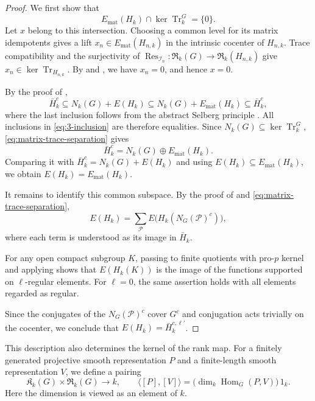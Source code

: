 \documentclass[11pt,letterpaper]{amsart}
\theoremstyle{definition}
\numberwithin{equation}{section}
\numberwithin{theorem}{section}
\newcommand{\kk}{k}
\newcommand{\CI}{\mathcal I}
\newcommand{\cR}{\mathfrak R}
\newcommand{\cK}{\mathfrak K}
\DeclareMathOperator{\Tr}{Tr}
\DeclareMathOperator{\Hom}{Hom}
\DeclareMathOperator{\Res}{Res}
\begin{document}
\begin{proof}We first show that
\begin{equation}\label{eq:matrix-trace-separation}
 E_{\mathrm{mat}}(H_\kk)\cap\ker\Tr_\kk^G=\{0\}.
\end{equation}
Let $x$ belong to this intersection. Choosing a common
level for its matrix idempotents gives a lift
$x_n\in E_{\mathrm{mat}}(H_{n,\kk})$ in the intrinsic
cocenter of $H_{n,\kk}$.
Trace compatibility and the surjectivity of
$\Res_{\CI_n}:\cR_\kk(G)\to\cR_\kk(H_{n,\kk})$
give $x_n\in\ker\Tr_{H_{n,\kk}}$.
By  and ,
we have $x_n=0$, and hence $x=0$.

By the proof of ,
\begin{equation}\label{eq:3-inclusion}
 \bar H_\kk^c
 \subseteq N_\kk(G)+E(H_\kk)
 \subseteq N_\kk(G)+E_{\mathrm{mat}}(H_\kk)
 \subseteq\bar H_\kk^c,
\end{equation}
where the last inclusion follows from the abstract
Selberg principle .
All inclusions in \eqref{eq:3-inclusion} are therefore equalities.
Since $N_\kk(G)\subseteq\ker\Tr_\kk^G$,
\eqref{eq:matrix-trace-separation} gives
\[
 \bar H_\kk^c=N_\kk(G)\oplus E_{\mathrm{mat}}(H_\kk).
\]
Comparing it with
$\bar H_\kk^c=N_\kk(G)+E(H_\kk)$ and using
$E(H_\kk)\subseteq E_{\mathrm{mat}}(H_\kk)$, we obtain
$E(H_\kk)=E_{\mathrm{mat}}(H_\kk)$.

It remains to identify this common subspace. By the proof of  and \eqref{eq:matrix-trace-separation},
\[
 E(H_\kk)
   =\sum_{\mathcal P}E\bigl(H_\kk(N_G(\mathcal P)^c)\bigr),
\]
where each term is understood as its image in $\bar H_\kk$.

For any open compact subgroup $K$, passing to finite
quotients with pro-$p$ kernel and applying
 shows that $E(H_\kk(K))$
is the image of the functions supported on $\ell$-regular
elements. For $\ell=0$, the same assertion holds with
all elements regarded as regular.

Since the conjugates of the $N_G(\mathcal P)^c$ cover
$G^c$ and conjugation acts trivially on the cocenter,
we conclude that $E(H_\kk)=\bar H_\kk^{c,\ell'}$.
\end{proof}

This description also determines the kernel of the rank map. For a finitely generated projective smooth representation $P$ and a finite-length smooth representation $V$, we define a pairing
\[
 \cK_\kk(G)\times\cR_\kk(G)\longrightarrow\kk,
 \qquad
 \langle[P],[V]\rangle
   =\bigl(\dim_\kk\Hom_G(P,V)\bigr)\,1_\kk.
\]
Here the dimension is viewed as an element of $\kk$.
\end{document}
